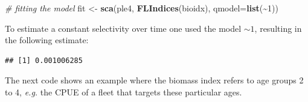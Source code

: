 \documentclass[
]{book}
\newenvironment{Shaded}{\begin{snugshade}}{\end{snugshade}}
\newcommand{\AttributeTok}[1]{\textcolor[rgb]{0.13,0.29,0.53}{#1}}
\newcommand{\CommentTok}[1]{\textcolor[rgb]{0.56,0.35,0.01}{\textit{#1}}}
\newcommand{\ConstantTok}[1]{\textcolor[rgb]{0.56,0.35,0.01}{#1}}
\newcommand{\DecValTok}[1]{\textcolor[rgb]{0.00,0.00,0.81}{#1}}
\newcommand{\FunctionTok}[1]{\textcolor[rgb]{0.13,0.29,0.53}{\textbf{#1}}}
\newcommand{\NormalTok}[1]{#1}
\newcommand{\OtherTok}[1]{\textcolor[rgb]{0.56,0.35,0.01}{#1}}
\newcommand{\SpecialCharTok}[1]{\textcolor[rgb]{0.81,0.36,0.00}{\textbf{#1}}}
\begin{document}
\begin{Shaded}
\begin{Highlighting}[]
\CommentTok{\# fitting the model}
\NormalTok{fit }\OtherTok{\textless{}{-}} \FunctionTok{sca}\NormalTok{(ple4, }\FunctionTok{FLIndices}\NormalTok{(bioidx), }\AttributeTok{qmodel=}\FunctionTok{list}\NormalTok{(}\SpecialCharTok{\textasciitilde{}}\DecValTok{1}\NormalTok{))}
\end{Highlighting}
\end{Shaded}

To estimate a constant selectivity over time one used the model \(\sim 1\), resulting in the following estimate:

\begin{Shaded}
\end{Shaded}

\begin{verbatim}
## [1] 0.001006285
\end{verbatim}

The next code shows an example where the biomass index refers to age groups 2 to 4, \emph{e.g.} the CPUE of a fleet that targets these particular ages.
\end{document}
